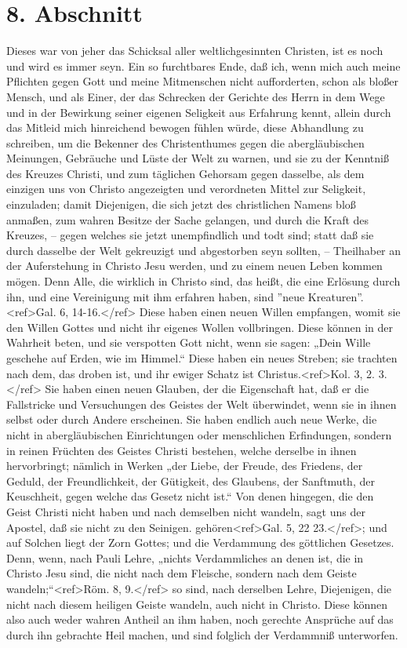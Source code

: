 \section{8. Abschnitt}

Dieses war von jeher das Schicksal aller weltlichgesinnten Christen, ist es noch und wird es immer seyn. Ein so furchtbares Ende, daß ich, wenn mich auch meine Pflichten gegen Gott und meine Mitmenschen nicht aufforderten, schon als bloßer Mensch, und als Einer, der das Schrecken der Gerichte des Herrn in dem Wege und in der Bewirkung seiner eigenen Seligkeit aus Erfahrung kennt, allein durch das Mitleid mich hinreichend bewogen fühlen würde, diese Abhandlung zu schreiben, um die Bekenner des Christenthumes gegen die abergläubischen Meinungen, Gebräuche und Lüste der Welt zu warnen, und sie zu der Kenntniß des Kreuzes Christi, und zum täglichen Gehorsam gegen dasselbe, als dem einzigen uns von Christo angezeigten und verordneten Mittel zur Seligkeit, einzuladen; damit Diejenigen, die sich jetzt des christlichen Namens bloß anmaßen, zum wahren Besitze der Sache gelangen, und durch die Kraft des Kreuzes, – gegen welches sie jetzt unempfindlich und todt sind; statt daß sie durch dasselbe der Welt gekreuzigt und abgestorben seyn sollten, – Theilhaber an der Auferstehung in Christo Jesu werden, und zu einem neuen Leben kommen mögen. Denn Alle, die wirklich in Christo sind, das heißt, die eine Erlösung durch ihn, und eine Vereinigung mit ihm erfahren haben, sind ''neue Kreaturen''.<ref>Gal. 6, 14-16.</ref> Diese haben einen neuen Willen empfangen, womit sie den Willen Gottes und nicht ihr eigenes Wollen vollbringen. Diese können in der Wahrheit beten, und sie verspotten Gott nicht, wenn sie sagen: „Dein Wille geschehe auf Erden, wie im Himmel.“ Diese haben ein neues Streben; sie trachten nach dem, das droben ist, und ihr ewiger Schatz ist Christus.<ref>Kol. 3, 2. 3.</ref> Sie haben einen neuen Glauben, der die Eigenschaft hat, daß er die Fallstricke und Versuchungen des Geistes der Welt überwindet, wenn sie in ihnen selbst oder durch Andere erscheinen. Sie haben endlich auch neue Werke, die nicht in abergläubischen Einrichtungen oder menschlichen Erfindungen, sondern in reinen Früchten des Geistes Christi bestehen, welche derselbe in ihnen hervorbringt; nämlich in Werken „der Liebe, der Freude, des Friedens, der Geduld, der Freundlichkeit, der Gütigkeit, des Glaubens, der Sanftmuth, der Keuschheit, gegen welche das Gesetz nicht ist.“ Von denen hingegen, die den Geist Christi nicht haben und nach demselben nicht wandeln, sagt uns der Apostel, daß sie nicht zu den Seinigen. gehören<ref>Gal. 5, 22 23.</ref>; und auf Solchen liegt der Zorn Gottes; und die Verdammung des göttlichen Gesetzes. Denn, wenn, nach Pauli Lehre, „nichts Verdammliches an denen ist, die in Christo Jesu sind, die nicht nach dem Fleische, sondern nach dem Geiste wandeln;“<ref>Röm. 8, 9.</ref> so sind, nach derselben Lehre, Diejenigen, die nicht nach diesem heiligen Geiste wandeln, auch nicht in Christo. Diese können also auch weder wahren Antheil an ihm haben, noch gerechte Ansprüche auf das durch ihn gebrachte Heil machen, und sind folglich der Verdammniß unterworfen. 

